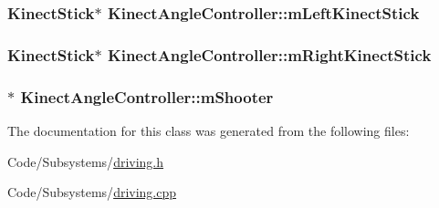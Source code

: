 \hypertarget{class_kinect_angle_controller_ad07d09210e69dbf154f0d3494d18652a}{
\subsubsection[{m\-Left\-Kinect\-Stick}]{\setlength{\rightskip}{0pt plus 5cm}\-Kinect\-Stick$\ast$ {\bf \-Kinect\-Angle\-Controller\-::m\-Left\-Kinect\-Stick}}}\label{class_kinect_angle_controller_ad07d09210e69dbf154f0d3494d18652a}
\hypertarget{class_kinect_angle_controller_a38a982263c4ebc386ecc1d82e728e43a}{
\subsubsection[{m\-Right\-Kinect\-Stick}]{\setlength{\rightskip}{0pt plus 5cm}\-Kinect\-Stick$\ast$ {\bf \-Kinect\-Angle\-Controller\-::m\-Right\-Kinect\-Stick}}}\label{class_kinect_angle_controller_a38a982263c4ebc386ecc1d82e728e43a}
\hypertarget{class_kinect_angle_controller_af4bdf40b256bdb2ea87258800def0219}{
\subsubsection[{m\-Shooter}]{$\ast$ {\bf \-Kinect\-Angle\-Controller\-::m\-Shooter}}}\label{class_kinect_angle_controller_af4bdf40b256bdb2ea87258800def0219}


\-The documentation for this class was generated from the following files\-:\begin{DoxyCompactItemize}
\item 
\-Code/\-Subsystems/\hyperlink{driving_8h}{driving.\-h}\item 
\-Code/\-Subsystems/\hyperlink{driving_8cpp}{driving.\-cpp}\end{DoxyCompactItemize}
